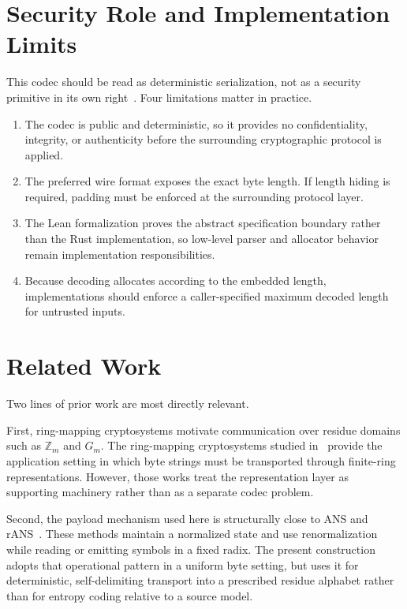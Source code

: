 \documentclass{system-security-article}
\newcommand{\Zm}{\ensuremath{\mathbb{Z}_m}}
\newcommand{\Gm}{\ensuremath{G_m}}
\begin{document}
    \section{Security Role and Implementation Limits}
    \label{sec:limits}

    This codec should be read as deterministic serialization, not as a security primitive in its own right~\cite{shannon1949}.
    Four limitations matter in practice.
    \begin{enumerate}
        \item The codec is public and deterministic, so it provides no confidentiality,
        integrity, or authenticity before the surrounding cryptographic protocol is applied.
        \item The preferred wire format exposes the exact byte length.
        If length hiding is required, padding must be enforced at the surrounding protocol layer.
        \item The Lean formalization proves the abstract specification boundary rather than the Rust
        implementation, so low-level parser and allocator behavior remain implementation responsibilities.
        \item Because decoding allocates according to the embedded length, implementations should
        enforce a caller-specified maximum decoded length for untrusted inputs.
    \end{enumerate}

    \section{Related Work}
    \label{sec:related}

    Two lines of prior work are most directly relevant.

    First, ring-mapping cryptosystems motivate communication over residue domains such as
    \(\Zm\) and \(\Gm\).
    The ring-mapping cryptosystems studied in~\cite{kryvyi2022symmetric,kryvyi2025symmetric}
    provide the application setting in which byte strings must be transported through finite-ring representations.
    However, those works treat the representation layer as supporting machinery rather than as a separate codec problem.

    Second, the payload mechanism used here is structurally close to ANS and rANS~\cite{duda2013ans,giesen2014rans}.
    These methods maintain a normalized state and use renormalization while reading or emitting symbols in a fixed radix.
    The present construction adopts that operational pattern in a uniform byte setting, but uses it for deterministic,
    self-delimiting transport into a prescribed residue alphabet rather than for entropy coding relative to a source model.
\end{document}
